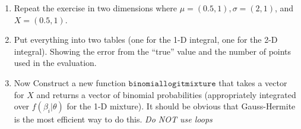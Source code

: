 \documentclass{article}
\begin{document}
\begin{enumerate}
\item Repeat the exercise in two dimensions where $\mu = (0.5,1), \sigma = (2,1)$, and $X=(0.5,1)$.
\item Put everything into two tables (one for the 1-D integral, one for the 2-D integral). Showing the error from the ``true'' value and the number of points used in the evaluation.
\begin{comment}
\begin{table}[htdp]
\caption{2-D Results True value: 0.7145}
\begin{center}
\begin{tabular}{l r r r }
Method & Points & Error\\
quad & n/a & 1e-14 \\
monte carlo & 100 &  0.0174\\
Gauss Hermite(PR) & 25 & 0.0250\\
SGI-GQN & 13 & 0.0091\\
SGI-KPN & 17 & -6.9355e-04\\
\end{tabular}
\end{center}
\end{table}%
\end{comment}
\item Now Construct a new function $\mathtt{binomiallogitmixture}$ that takes a vector for $X$ and returns a vector of binomial probabilities (appropriately integrated over $f(\beta_i | \theta)$ for the 1-D mixture). It should be obvious that Gauss-Hermite is the most efficient way to do this. \textit{Do NOT use loops}
\end{enumerate}
\end{document}
